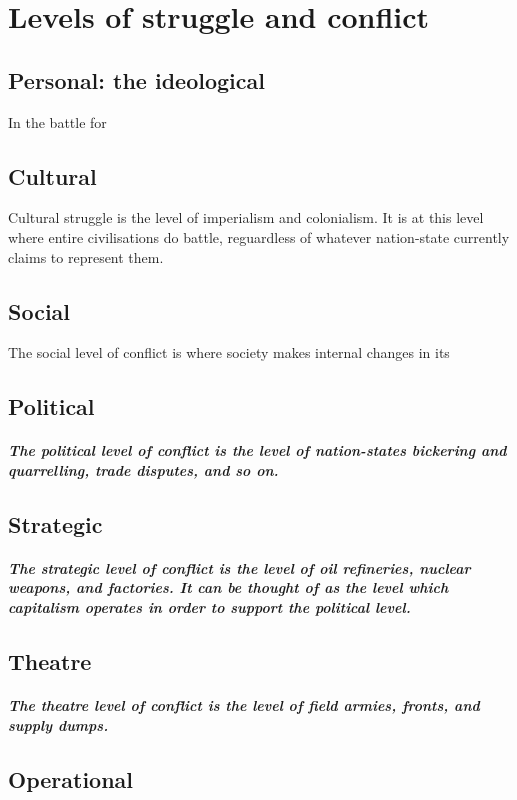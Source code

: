   \chapter{Levels of struggle and conflict}
    \section{Personal: the ideological}
      In the battle for
    \section{Cultural}
      Cultural struggle is the level of imperialism and colonialism. It is at this level where entire civilisations do battle, reguardless of whatever nation-state currently claims to represent them. 
    \section{Social}
      The social level of conflict is where society makes internal changes in its 
    \section{Political}
      \paragraph{The political level of conflict is the level of nation-states bickering and quarrelling, trade disputes, and so on.}
    \section{Strategic}
      \paragraph{The strategic level of conflict is the level of oil refineries, nuclear weapons, and factories. It can be thought of as the level which capitalism operates in order to support the political level.}
    \section{Theatre}
      \paragraph{The theatre level of conflict is the level of field armies, fronts, and supply dumps.}
    \section{Operational}
